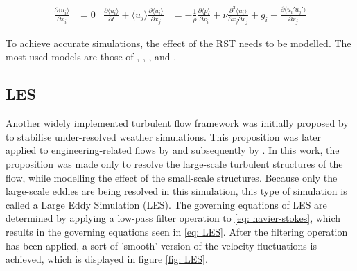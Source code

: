 \begin{subequations} \label{eq: RANS}

    \begin{equation} \label{eq: RANSCont}
    \begin{aligned}
    \frac{\partial \langle u_i \rangle}{\partial x_i} &= 0
    \end{aligned}
    \end{equation}

    \begin{equation} \label{eq: RANSMomentum}
    \begin{aligned}
   \frac{\partial \langle u_i \rangle}{\partial t} 
   + 
   \langle u_j \rangle \frac{\partial \langle u_i \rangle}{\partial x_j} 
   &= 
   -\frac{1}{\rho} \frac{\partial \langle p \rangle}{\partial x_i} 
   + 
   \nu \frac{\partial^2 \langle u_i \rangle}{\partial x_j \partial x_j}
   + 
   g_i
    -
   \frac{\partial \langle u_i' u_j' \rangle}{\partial x_j}
    \end{aligned}
    \end{equation}
\end{subequations}


To achieve accurate simulations, the effect of the RST needs to be modelled. The most used models are those of \textcite{Launder1974}, \textcite{Wilcox1988}, \textcite{Spalart1992e}, \textcite{Launder1975} and \textcite{Speziale1991}. 


\subsection{LES}
Another widely implemented turbulent flow framework was initially proposed by \textcite{Smagorinsky1963} to stabilise under-resolved weather simulations. This proposition was later applied to engineering-related flows by \cite{Deardoff1970} and subsequently by \textcite{Schumann1975}. In this work, the proposition was made only to resolve the large-scale turbulent structures of the flow, while modelling the effect of the small-scale structures. Because only the large-scale eddies are being resolved in this simulation, this type of simulation is called a Large Eddy Simulation (LES). The governing equations of LES are determined by applying a low-pass filter operation to \autoref{eq: navier-stokes}, which results in the governing equations seen in \autoref{eq: LES}. After the filtering operation has been applied, a sort of 'smooth' version of the velocity fluctuations is achieved, which is displayed in figure \autoref{fig: LES}. 


